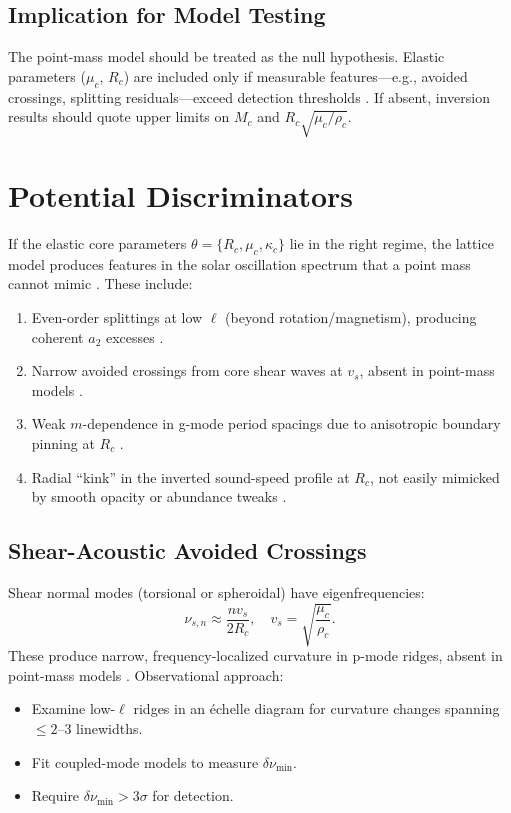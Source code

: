 \documentclass{article}
\begin{document}
\subsection{Implication for Model Testing}

The point-mass model should be treated as the null hypothesis. Elastic parameters ($\mu_c$, $R_c$) are included only if measurable features---e.g., avoided crossings, splitting residuals---exceed detection thresholds \citep{aerts2010, lund2017}. If absent, inversion results should quote upper limits on $M_c$ and $R_c \sqrt{\mu_c / \rho_c}$.

\section{Potential Discriminators}

If the elastic core parameters $\theta = \{R_c, \mu_c, \kappa_c\}$ lie in the right regime, the lattice model produces features in the solar oscillation spectrum that a point mass cannot mimic \citep{bellinger2025}. These include:
\begin{enumerate}
\item Even-order splittings at low $\ell$ (beyond rotation/magnetism), producing coherent $a_2$ excesses \citep{lund2017}.
\item Narrow avoided crossings from core shear waves at $v_s$, absent in point-mass models \citep{aerts2010}.
\item Weak $m$-dependence in g-mode period spacings due to anisotropic boundary pinning at $R_c$ \citep{bellinger2025}.
\item Radial ``kink'' in the inverted sound-speed profile at $R_c$, not easily mimicked by smooth opacity or abundance tweaks \citep{buldgen2023}.
\end{enumerate}

\subsection{Shear-Acoustic Avoided Crossings}

Shear normal modes (torsional or spheroidal) have eigenfrequencies:
\[
\nu_{s,n} \approx \frac{n v_s}{2 R_c}, \quad v_s = \sqrt{\frac{\mu_c}{\rho_c}}.
\]
These produce narrow, frequency-localized curvature in p-mode ridges, absent in point-mass models \citep{aerts2010}. Observational approach:
\begin{itemize}
\item Examine low-$\ell$ ridges in an échelle diagram for curvature changes spanning $\leq 2$--3 linewidths.
\item Fit coupled-mode models to measure $\delta \nu_{\min}$.
\item Require $\delta \nu_{\min} > 3\sigma$ for detection.
\end{itemize}
\end{document}
